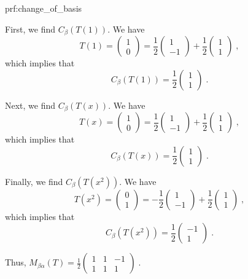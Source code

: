 \begin{prf}{prf:change_of_basis} %

First, we find $C_{\beta}\left(T(1)\right)$. We have
$$T(1) = \begin{pmatrix}1 \\ 0\end{pmatrix} = \frac{1}{2}\begin{pmatrix}1 \\ -1\end{pmatrix} + \frac{1}{2}\begin{pmatrix}1 \\ 1\end{pmatrix}\;,$$
which implies that
$$C_{\beta}\left(T(1)\right) = \frac{1}{2}\begin{pmatrix} 1 \\ 1\end{pmatrix}\;.$$

Next, we find $C_{\beta}\left(T(x)\right).$ We have
$$T(x) = \begin{pmatrix}1 \\ 0\end{pmatrix} = \frac{1}{2}\begin{pmatrix}1 \\ -1\end{pmatrix} + \frac{1}{2}\begin{pmatrix}1 \\ 1\end{pmatrix}\;,$$
which implies that
$$C_{\beta}\left(T(x)\right) = \frac{1}{2}\begin{pmatrix} 1 \\ 1\end{pmatrix}\;.$$

Finally, we find $C_{\beta}\left(T(x^2)\right).$ We have
$$T(x^2) = \begin{pmatrix}0 \\ 1\end{pmatrix} = -\frac{1}{2}\begin{pmatrix}1 \\ -1\end{pmatrix} + \frac{1}{2}\begin{pmatrix}1 \\ 1\end{pmatrix}\;,$$
which implies that
$$C_{\beta}\left(T(x^2)\right) = \frac{1}{2}\begin{pmatrix} -1 \\ 1\end{pmatrix}\;.$$

Thus, $M_{\beta\alpha}(T) = \frac{1}{2}\begin{pmatrix}1 & 1 & -1 \\ 1 & 1 & 1\end{pmatrix}\;.$


\end{prf}
